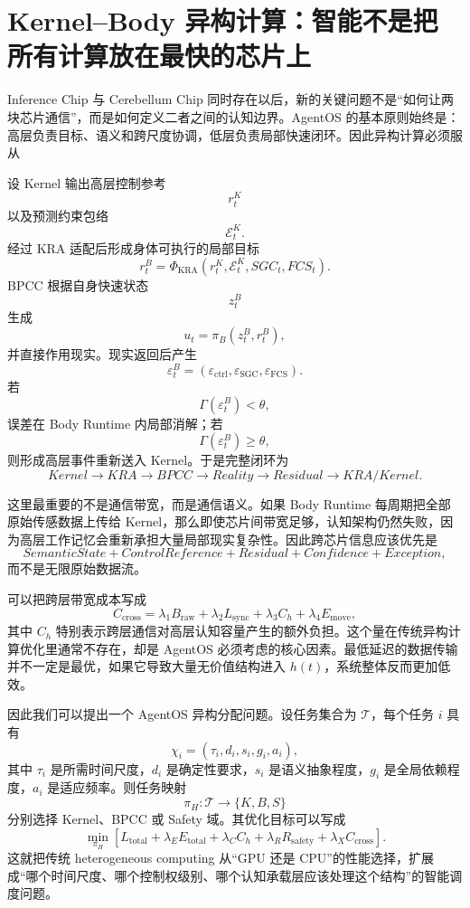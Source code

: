 \section{Kernel--Body 异构计算：智能不是把所有计算放在最快的芯片上}

Inference Chip 与 Cerebellum Chip 同时存在以后，新的关键问题不是“如何让两块芯片通信”，而是如何定义二者之间的认知边界。AgentOS 的基本原则始终是：高层负责目标、语义和跨尺度协调，低层负责局部快速闭环。因此异构计算必须服从
\begin{statementbox}
\centering
{}
\end{statementbox}

设 Kernel 输出高层控制参考
\[
r_t^K
\]
以及预测约束包络
\[
\mathcal E_t^K.
\]
经过 KRA 适配后形成身体可执行的局部目标
\[
r_t^B
=
\Phi_{\mathrm{KRA}}
(
r_t^K,
\mathcal E_t^K,
SGC_t,
FCS_t
).
\]
BPCC 根据自身快速状态
\[
z_t^{B}
\]
生成
\[
u_t
=
\pi_B(
z_t^B,
r_t^B
),
\]
并直接作用现实。现实返回后产生
\[
\varepsilon_t^B
=
(
\varepsilon_{\mathrm{ctrl}},
\varepsilon_{\mathrm{SGC}},
\varepsilon_{\mathrm{FCS}}
).
\]
若
\[
\Gamma(\varepsilon_t^B)<\theta,
\]
误差在 Body Runtime 内局部消解；若
\[
\Gamma(\varepsilon_t^B)\geq\theta,
\]
则形成高层事件重新送入 Kernel。于是完整闭环为
\[
Kernel
\rightarrow
KRA
\rightarrow
BPCC
\rightarrow
Reality
\rightarrow
Residual
\rightarrow
KRA/Kernel.
\]

这里最重要的不是通信带宽，而是通信语义。如果 Body Runtime 每周期把全部原始传感数据上传给 Kernel，那么即使芯片间带宽足够，认知架构仍然失败，因为高层工作记忆会重新承担大量局部现实复杂性。因此跨芯片信息应该优先是
\[
SemanticState
+
ControlReference
+
Residual
+
Confidence
+
Exception,
\]
而不是无限原始数据流。

可以把跨层带宽成本写成
\[
C_{\mathrm{cross}}
=
\lambda_1 B_{\mathrm{raw}}
+
\lambda_2 L_{\mathrm{sync}}
+
\lambda_3 C_h
+
\lambda_4 E_{\mathrm{move}},
\]
其中 $C_h$ 特别表示跨层通信对高层认知容量产生的额外负担。这个量在传统异构计算优化里通常不存在，却是 AgentOS 必须考虑的核心因素。最低延迟的数据传输并不一定是最优，如果它导致大量无价值结构进入 $h(t)$，系统整体反而更加低效。

因此我们可以提出一个 AgentOS 异构分配问题。设任务集合为 $\mathcal T$，每个任务 $i$ 具有
\[
\chi_i=
(
\tau_i,
d_i,
s_i,
g_i,
a_i
),
\]
其中 $\tau_i$ 是所需时间尺度，$d_i$ 是确定性要求，$s_i$ 是语义抽象程度，$g_i$ 是全局依赖程度，$a_i$ 是适应频率。则任务映射
\[
\pi_H:\mathcal T\rightarrow\{K,B,S\}
\]
分别选择 Kernel、BPCC 或 Safety 域。其优化目标可以写成
\[
\min_{\pi_H}
\left[
L_{\mathrm{total}}
+
\lambda_E E_{\mathrm{total}}
+
\lambda_C C_h
+
\lambda_R R_{\mathrm{safety}}
+
\lambda_X C_{\mathrm{cross}}
\right].
\]
这就把传统 heterogeneous computing 从“GPU 还是 CPU”的性能选择，扩展成“哪个时间尺度、哪个控制权级别、哪个认知承载层应该处理这个结构”的智能调度问题。

